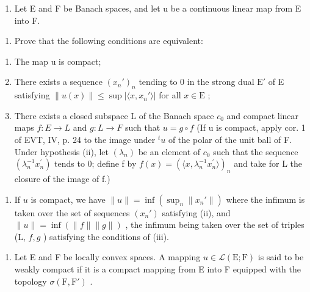 \begin{enumerate}
\def\labelenumi{\arabic{enumi})}
\setcounter{enumi}{25}
\tightlist
\item
  Let E and F be Banach spaces, and let u be a continuous linear map from E into F.
\end{enumerate}

\begin{enumerate}
\def\labelenumi{\alph{enumi})}
\tightlist
\item
  Prove that the following conditions are equivalent:
\end{enumerate}

\begin{enumerate}
\def\labelenumi{(\roman{enumi})}
\item
  The map u is compact;
\item
  There exists a sequence \((x_n')_n\) tending to 0 in the strong dual \(\mathrm{E}'\) of E satisfying \(\| u(x)\| \leqslant \sup |\langle x,x_n' \rangle|\) for all \(x \in \mathrm{E}\) ;
\item
  There exists a closed subspace L of the Banach space \(c_{0}\) and compact linear maps \(f: E \to L\) and \(g: L \to F\) such that \(u = g \circ f\) (If u is compact, apply cor. 1 of EVT, IV, p. 24 to the image under \(^{t}u\) of the polar of the unit ball of F. Under hypothesis (ii), let \((\lambda_{n})\) be an element of \(c_{0}\) such that the sequence \((\lambda_{n}^{-1}x_{n}^{\prime})\) tends to 0; define f by \(f(x) = (\langle x, \lambda_{n}^{-1}x_{n}^{\prime} \rangle)_{n}\) and take for L the closure of the image of f.)
\end{enumerate}

\begin{enumerate}
\def\labelenumi{\alph{enumi})}
\setcounter{enumi}{1}
\tightlist
\item
  If \(u\) is compact, we have \(\|u\| = \inf(\sup_n \|x_n'\|)\) where the infimum is taken over the set of sequences \((x_n')\) satisfying (ii), and \(\|u\| = \inf(\|f\|\|g\|)\) , the infimum being taken over the set of triples (L, \(f,g\) ) satisfying the conditions of (iii).
\end{enumerate}

\begin{enumerate}
\def\labelenumi{\arabic{enumi})}
\setcounter{enumi}{26}
\tightlist
\item
  Let E and F be locally convex spaces. A mapping \(u \in \mathcal{L}(\mathrm{E};\mathrm{F})\) is said to be weakly compact if it is a compact mapping from E into F equipped with the topology \(\sigma(\mathrm{F},\mathrm{F}')\) .
\end{enumerate}

